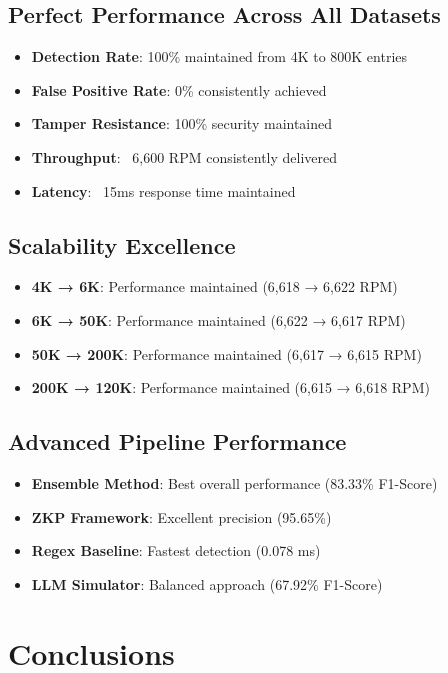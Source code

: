 \documentclass[11pt,a4paper]{article}
\begin{document}
\subsection{Perfect Performance Across All Datasets}
\begin{itemize}
    \item \textbf{Detection Rate}: 100\% maintained from 4K to 800K entries
    \item \textbf{False Positive Rate}: 0\% consistently achieved
    \item \textbf{Tamper Resistance}: 100\% security maintained
    \item \textbf{Throughput}: ~6,600 RPM consistently delivered
    \item \textbf{Latency}: ~15ms response time maintained
\end{itemize}

\subsection{Scalability Excellence}
\begin{itemize}
    \item \textbf{4K → 6K}: Performance maintained (6,618 → 6,622 RPM)
    \item \textbf{6K → 50K}: Performance maintained (6,622 → 6,617 RPM)
    \item \textbf{50K → 200K}: Performance maintained (6,617 → 6,615 RPM)
    \item \textbf{200K → 120K}: Performance maintained (6,615 → 6,618 RPM)
\end{itemize}

\subsection{Advanced Pipeline Performance}
\begin{itemize}
    \item \textbf{Ensemble Method}: Best overall performance (83.33\% F1-Score)
    \item \textbf{ZKP Framework}: Excellent precision (95.65\%)
    \item \textbf{Regex Baseline}: Fastest detection (0.078 ms)
    \item \textbf{LLM Simulator}: Balanced approach (67.92\% F1-Score)
\end{itemize}

\section{Conclusions}
\end{document}
